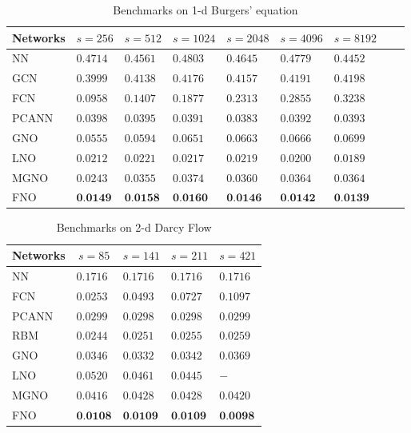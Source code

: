 \documentclass{article} %
\begin{document}
\begin{table}[h]
\caption{ Benchmarks on 1-d Burgers' equation} 
\label{table:burgers}
\begin{center}
\begin{tabular}{l|llllllll}
\multicolumn{1}{c}{\bf Networks}
&\multicolumn{1}{c}{\bf $s=256$}
&\multicolumn{1}{c}{\bf $s=512$}
&\multicolumn{1}{c}{\bf $s=1024$}
&\multicolumn{1}{c}{\bf $s=2048$} 
&\multicolumn{1}{c}{\bf $s=4096$}
&\multicolumn{1}{c}{\bf $s=8192$}\\
\hline 
NN       &$0.4714$ &$0.4561$
&$0.4803$ &$0.4645$ &$0.4779$ &$0.4452$ \\
GCN           &$0.3999$ &$0.4138$
&$0.4176$   &$0.4157$  &$0.4191$ &$0.4198$\\
FCN         &$0.0958$ &$0.1407$
&$0.1877$   &$0.2313$  &$0.2855$ &$0.3238$\\
PCANN       &$0.0398$ &$0.0395$
&$0.0391$   &$0.0383$  &$0.0392$ &$0.0393$\\
\hline 
GNO     &$0.0555$ &$0.0594$ &$0.0651$   &$0.0663$  &$0.0666$ &$0.0699$\\
LNO      &$0.0212$ &$0.0221$
   &$0.0217$  &$0.0219$ &$0.0200$ &$0.0189$\\
MGNO      &$0.0243$ &$0.0355$
   &$0.0374$  &$0.0360$ &$0.0364$ &$0.0364$\\
FNO     &$\textbf{0.0149}$ &$\textbf{0.0158}$
   &$\textbf{0.0160}$  &$\textbf{0.0146}$ &$\textbf{0.0142}$ &$\textbf{0.0139}$\\
\hline 
\end{tabular}
\end{center}
\end{table}

\begin{table}[h]
\caption{Benchmarks on 2-d Darcy Flow}
\label{table:darcy}
\begin{center}
\begin{tabular}{l|llll}
\multicolumn{1}{c}{\bf Networks} 
&\multicolumn{1}{c}{\bf $s=85$}
&\multicolumn{1}{c}{\bf $s=141$} 
&\multicolumn{1}{c}{\bf $s=211$}
&\multicolumn{1}{c}{\bf $s=421$}\\
\hline
NN       &$0.1716$  &$0.1716$  &$0.1716$ &$0.1716$\\
FCN       &$0.0253$  &$0.0493$  &$0.0727$ & $0.1097$\\
PCANN      &$0.0299$  &$0.0298$  &$0.0298$ & $0.0299$\\
RBM    &$0.0244$ &$0.0251$ &$0.0255$ &$0.0259$ \\
\hline 
GNO     &$0.0346$   &$0.0332$  &$0.0342$ &$0.0369$\\
LNO     &$0.0520$  &$0.0461$  &$0.0445$ &$-$\\
MGNO     &$0.0416$   &$0.0428$  &$0.0428$ &$0.0420$\\
FNO     &$\textbf{0.0108}$  &$\textbf{0.0109}$  &$\textbf{0.0109}$ &$\textbf{0.0098}$\\
\hline 
\end{tabular}
\end{center}
\end{table}
\end{document}
